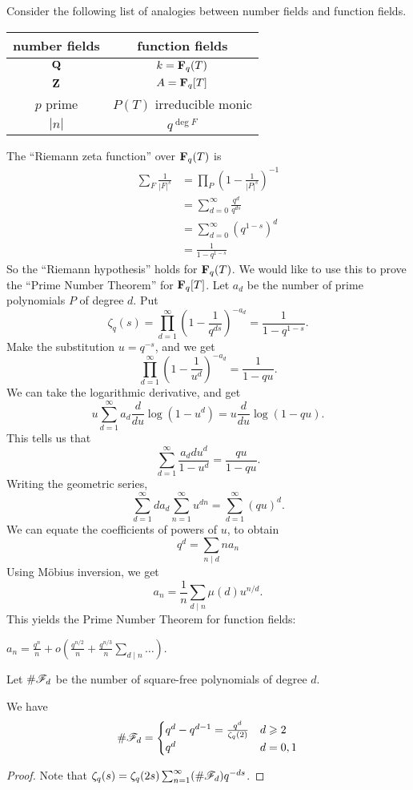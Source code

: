 Consider the following list of analogies between number fields and 
function fields. 
\begin{center}
\begin{tabular}{c|c}
  number fields & function fields \\ \hline
  $\mathbf{Q}$ & $k=\mathbf{F}_q(T)$ \\
  $\mathbf{Z}$ & $A=\mathbf{F}_q[T]$ \\
  $p$ prime & $P(T)$ irreducible monic \\
  $|n|$ & $q^{\deg F}$
\end{tabular}
\end{center}
The ``Riemann zeta function'' over $\mathbf{F}_q(T)$ is 
\begin{align*}
  \sum_F \frac{1}{|F|^s} 
    &= \prod_P \left(1-\frac{1}{|P|^s}\right)^{-1} \\
    &= \sum_{d=0}^\infty \frac{q^d}{q^{d s}} \\
    &= \sum_{d=0}^\infty (q^{1-s})^d \\
    &= \frac{1}{1-q^{1-s}}
\end{align*}
So the ``Riemann hypothesis'' holds for $\mathbf{F}_q(T)$. We would like to use this 
to prove the ``Prime Number Theorem'' for $\mathbf{F}_q[T]$. Let $a_d$ be the number 
of prime polynomials $P$ of degree $d$. Put 
\[
  \zeta_q(s) = \prod_{d=1}^\infty \left(1-\frac{1}{q^{d s}}\right)^{-a_d} = \frac{1}{1-q^{1-s}} .
\]
Make the substitution $u=q^{-s}$, and we get 
\[
  \prod_{d=1}^\infty \left(1-\frac{1}{u^d}\right)^{-a_d} = \frac{1}{1-q u} .
\]
We can take the logarithmic derivative, and get
\[
  u\sum_{d=1}^\infty a_d \frac{d}{du} \log(1-u^d) = u\frac{d}{du}\log(1-q u). 
\]
This tells us that 
\[
  \sum_{d=1}^\infty \frac{a_d d u^d}{1-u^d} = \frac{q u}{1-q u} .
\]
Writing the geometric series, 
\[
  \sum_{d=1}^\infty d a_d \sum_{n=1}^\infty u^{d n} = \sum_{d=1}^\infty (q u)^d .
\]
We can equate the coefficients of powers of $u$, to obtain 
\[
  q^d = \sum_{n\mid d} n a_n 
\]
Using M\"obius inversion, we get 
\[
  a_n = \frac 1 n \sum_{d\mid n} \mu(d) u^{n/d} .
\]
This yields the Prime Number Theorem for function fields:

\begin{theorem}
$a_n = \frac{q^n}{n} + o(\frac{q^{n/2}}{n}+\frac{q^{n/3}}{n}\sum_{d\mid n}\ldots)$. 
\end{theorem}

Let $\#\mathscr{F}_d$ be the number of square-free polynomials of degree $d$. 

\begin{lemma}
We have 
\[
  \#\mathscr{F}_d = \begin{cases} 
              q^d - q^{d-1} = \frac{q^d}{\zeta_q(2)} & d\geqslant 2 \\
               q^d & d=0,1 
            \end{cases}
\]
\end{lemma}
\begin{proof}
Note that $\zeta_q(s) = \zeta_q(2 s) \sum_{n=1}^\infty (\# \mathscr{F}_d) q^{-d s}$. 
\end{proof}

